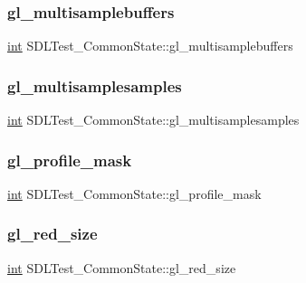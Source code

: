 \subsubsection{\texorpdfstring{gl\_multisamplebuffers}{gl\_multisamplebuffers}}
{\footnotesize\ttfamily \mbox{\hyperlink{warnings_8h_a74f207b5aa4ba51c3a2ad59b219a423b}{int}} S\+D\+L\+Test\+\_\+\+Common\+State\+::gl\+\_\+multisamplebuffers}

\mbox{\label{struct_s_d_l_test___common_state_a96718b47862d4962e4a7ae9a62ce4a30}} 
\subsubsection{\texorpdfstring{gl\_multisamplesamples}{gl\_multisamplesamples}}
{\footnotesize\ttfamily \mbox{\hyperlink{warnings_8h_a74f207b5aa4ba51c3a2ad59b219a423b}{int}} S\+D\+L\+Test\+\_\+\+Common\+State\+::gl\+\_\+multisamplesamples}

\mbox{\label{struct_s_d_l_test___common_state_aa923ff5f227c35523a4e491863a7d907}} 
\subsubsection{\texorpdfstring{gl\_profile\_mask}{gl\_profile\_mask}}
{\footnotesize\ttfamily \mbox{\hyperlink{warnings_8h_a74f207b5aa4ba51c3a2ad59b219a423b}{int}} S\+D\+L\+Test\+\_\+\+Common\+State\+::gl\+\_\+profile\+\_\+mask}

\mbox{\label{struct_s_d_l_test___common_state_a33772305944410d726908efb5e0663ce}} 
\subsubsection{\texorpdfstring{gl\_red\_size}{gl\_red\_size}}
{\footnotesize\ttfamily \mbox{\hyperlink{warnings_8h_a74f207b5aa4ba51c3a2ad59b219a423b}{int}} S\+D\+L\+Test\+\_\+\+Common\+State\+::gl\+\_\+red\+\_\+size}

